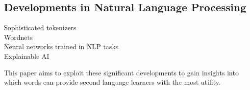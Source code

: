 \subsection{Developments in Natural Language Processing}
\begin{description}
	\item [Sophisticated tokenizers]
	\item [Wordnets]
	\item [Neural networks trained in NLP tasks]
	\item [Explainable AI]
\end{description}

This paper aims to exploit these significant developments to gain insights into which words can provide second language learners with the most utility. 

